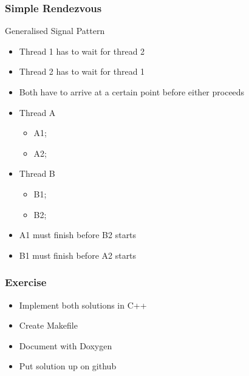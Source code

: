 \documentclass{beamer}
\begin{document}
\begin{frame}
	\frametitle{Simple Rendezvous}
	Generalised Signal Pattern
	\begin{itemize}
	\item Thread 1 has to wait for thread 2
	\item Thread 2 has to wait for thread 1
	\item Both have to arrive at a certain point before either proceeds
	\item Thread A
	\begin{itemize}
		\item A1;
		\item A2;
	\end{itemize}
	\item Thread B
	\begin{itemize}
		\item B1;
		\item B2;
	\end{itemize}
	\item A1 must finish before B2 starts
	\item B1 must finish before A2 starts
	\end{itemize}
\end{frame}


\begin{frame}
	\frametitle{Exercise}
	\begin{itemize}
	\item Implement both solutions in C++
	\item Create Makefile
	\item Document with Doxygen
	\item Put solution up on github
	\end{itemize}
	
\end{frame}


    
\end{document}
